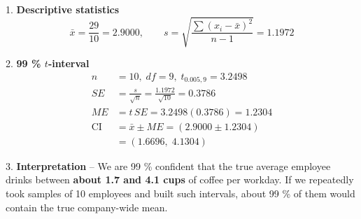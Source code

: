 \documentclass{article}
\begin{document}
1. \textbf{Descriptive statistics}
$$
\bar x=\frac{29}{10}=2.9000,\qquad
s=\sqrt{\frac{\sum(x_i-\bar x)^2}{n-1}}=1.1972
$$

2. \textbf{99 \% $t$-interval}
$$
\begin{aligned}
n&=10,\;df=9,\;t_{0.005,9}=3.2498\\[2pt]
SE&=\frac{s}{\sqrt{n}}=\frac{1.1972}{\sqrt{10}}=0.3786\\[2pt]
ME&=t\,SE=3.2498(0.3786)=1.2304\\[4pt]
\text{CI}&=\bar x\pm ME=(2.9000\pm1.2304) \\
&=(1.6696,\;4.1304)
\end{aligned}
$$

3. \textbf{Interpretation} – We are 99 \% confident that the true average employee drinks between \textbf{about 1.7 and 4.1 cups} of coffee per workday. If we repeatedly took samples of 10 employees and built such intervals, about 99 \% of them would contain the true company-wide mean.
\end{document}
